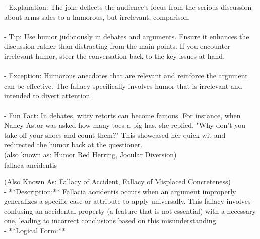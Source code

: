 \documentclass[a4paper,12pt,single,pdftex]{scrbook}
\begin{document}
    
        - Explanation: The joke deflects the audience's focus from the serious discussion about arms sales to a humorous, but irrelevant, comparison.
    \\

    
      
    \\

    
      - Tip: Use humor judiciously in debates and arguments. Ensure it enhances the discussion rather than distracting from the main points. If you encounter irrelevant humor, steer the conversation back to the key issues at hand.
    \\

    
      
    \\

    
      - Exception: Humorous anecdotes that are relevant and reinforce the argument can be effective. The fallacy specifically involves humor that is irrelevant and intended to divert attention.
    \\

    
      
    \\

    
      - Fun Fact: In debates, witty retorts can become famous. For instance, when Nancy Astor was asked how many toes a pig has, she replied, "Why don’t you take off your shoes and count them?" This showcased her quick wit and redirected the humor back at the questioner.
    \\

  
    
      (also known as: Humor Red Herring, Jocular Diversion)
    \\

  

fallaca ancidentis
    
      (Also Known As: Fallacy of Accident, Fallacy of Misplaced Concreteness)
    \\

  
    
      - **Description:** Fallacia accidentis occurs when an argument improperly generalizes a specific case or attribute to apply universally. This fallacy involves confusing an accidental property (a feature that is not essential) with a necessary one, leading to incorrect conclusions based on this misunderstanding.
    \\

    
      - **Logical Form:**
    \\
\end{document}
